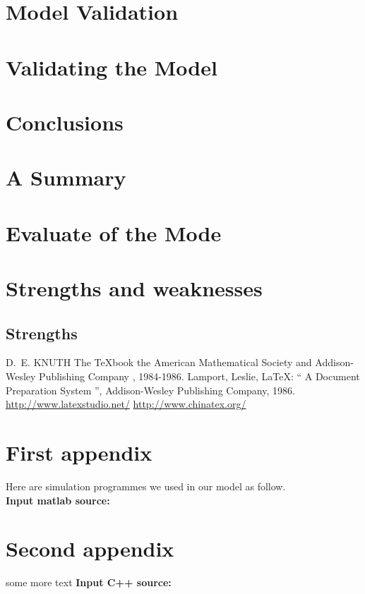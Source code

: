 \documentclass{mcmthesis}
\begin{document}
\section{Model Validation}

\section{Validating the Model}


\section{Conclusions}


\section{A Summary}


\section{Evaluate of the Mode}

\section{Strengths and weaknesses}


\subsection{Strengths}


\begin{thebibliography}{99}
 D.~E. KNUTH   The \TeX{}book  the American
Mathematical Society and Addison-Wesley
Publishing Company , 1984-1986.
Lamport, Leslie,  \LaTeX{}: `` A Document Preparation System '',
Addison-Wesley Publishing Company, 1986.
\url{http://www.latexstudio.net/}
\url{http://www.chinatex.org/}
\end{thebibliography}

\begin{appendices}

\section{First appendix}

\lipsum[13]

Here are simulation programmes we used in our model as follow.\\

\textbf{\textcolor[rgb]{0.98,0.00,0.00}{Input matlab source:}}


\section{Second appendix}

some more text \textcolor[rgb]{0.98,0.00,0.00}{\textbf{Input C++ source:}}


\end{appendices}
\end{document}
